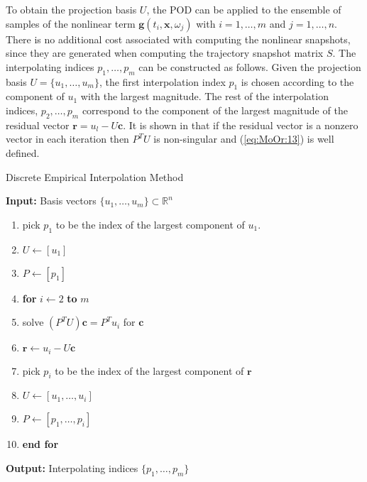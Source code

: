 \documentclass[final]{siamart}
\begin{document}
{{\color{black}} To obtain the projection basis $U$, the POD can be applied to the ensemble of samples of the nonlinear term $\mathbf g(t_i,\mathbf x, \omega_j)$ with $i=1,\dots,m$ and $j=1,\dots,n$}. There is no additional cost {{\color{black}} associated with} computing the nonlinear snapshots, since they are generated when computing the trajectory snapshot matrix $S$. The interpolating indices $p_1,\dots,p_m$ can be constructed as follows. Given the projection basis $U = \{u_1,\dots,u_m\}$, the first interpolation index $p_1$ is chosen according to the component of $u_1$ with the largest magnitude. The rest of the interpolation indices, $p_2,\dots,p_m$ correspond to the component of the largest magnitude of the residual vector $\mathbf r = u_l - U \mathbf c$. It is shown in \cite{Chaturantabut:2010cz} that if the residual vector is a nonzero vector in each iteration then $P^TU$ is non-singular and (\ref{eq:MoOr:13}) is well defined. 

\begin{algorithm} 
\caption{Discrete Empirical Interpolation Method} \label{alg:MoOr:1}
{\bf Input:}  Basis vectors $\{u_1,\dots , u_m\}\subset \mathbb R^n$
\begin{enumerate}
\item pick $p_1$ to be the index of the largest component of $u_1$.
\item $U \leftarrow [u_1]$
\item $P \leftarrow [p_1]$
\item \textbf{for} $i\leftarrow 2$ \textbf{to} $m$
\item \hspace{0.5cm} solve $(P^TU)\mathbf c = P^T u_i$ for $\mathbf c$
\item \hspace{0.5cm} $\mathbf r \leftarrow u_i - U\mathbf c$
\item \hspace{0.5cm} pick $p_i$ to be the index of the largest component of $\mathbf r$
\item \hspace{0.5cm} $U \leftarrow [u_1,\dots,u_i]$
\item \hspace{0.5cm} $P \leftarrow [p_1,\dots,p_i]$
\item \textbf{end for}
\end{enumerate}
\vspace{0.5cm}
{\bf Output:} Interpolating indices $\{p_1,\dots,p_m\}$
\end{algorithm}
\end{document}
